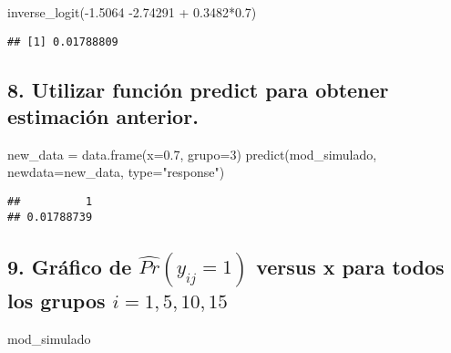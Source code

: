 \documentclass[
]{article}
\newenvironment{Shaded}{\begin{snugshade}}{\end{snugshade}}
\newcommand{\AttributeTok}[1]{\textcolor[rgb]{0.77,0.63,0.00}{#1}}
\newcommand{\DecValTok}[1]{\textcolor[rgb]{0.00,0.00,0.81}{#1}}
\newcommand{\FloatTok}[1]{\textcolor[rgb]{0.00,0.00,0.81}{#1}}
\newcommand{\FunctionTok}[1]{\textcolor[rgb]{0.00,0.00,0.00}{#1}}
\newcommand{\NormalTok}[1]{#1}
\newcommand{\OtherTok}[1]{\textcolor[rgb]{0.56,0.35,0.01}{#1}}
\newcommand{\SpecialCharTok}[1]{\textcolor[rgb]{0.00,0.00,0.00}{#1}}
\newcommand{\StringTok}[1]{\textcolor[rgb]{0.31,0.60,0.02}{#1}}
\begin{document}
\begin{Shaded}
\begin{Highlighting}[]
\FunctionTok{inverse\_logit}\NormalTok{(}\SpecialCharTok{{-}}\FloatTok{1.5064} \SpecialCharTok{{-}}\FloatTok{2.74291}   \SpecialCharTok{+} \FloatTok{0.3482}\SpecialCharTok{*}\FloatTok{0.7}\NormalTok{)}
\end{Highlighting}
\end{Shaded}

\begin{verbatim}
## [1] 0.01788809
\end{verbatim}

\hypertarget{utilizar-funciuxf3n-predict-para-obtener-estimaciuxf3n-anterior.}{%
\subsection{8. Utilizar función predict para obtener estimación
anterior.}\label{utilizar-funciuxf3n-predict-para-obtener-estimaciuxf3n-anterior.}}

\begin{Shaded}
\begin{Highlighting}[]
\NormalTok{new\_data }\OtherTok{=} \FunctionTok{data.frame}\NormalTok{(}\AttributeTok{x=}\FloatTok{0.7}\NormalTok{, }\AttributeTok{grupo=}\DecValTok{3}\NormalTok{)}
\FunctionTok{predict}\NormalTok{(mod\_simulado, }\AttributeTok{newdata=}\NormalTok{new\_data, }\AttributeTok{type=}\StringTok{"response"}\NormalTok{)}
\end{Highlighting}
\end{Shaded}

\begin{verbatim}
##          1 
## 0.01788739
\end{verbatim}

\hypertarget{gruxe1fico-de-widehatpry_ij-1-versus-x-para-todos-los-grupos-i1-5-10-15}{%
\subsection{\texorpdfstring{9. Gráfico de \(\widehat{Pr}(y_{ij} = 1)\)
versus x para todos los grupos
\(i=1, 5, 10, 15\)}{9. Gráfico de \textbackslash widehat\{Pr\}(y\_\{ij\} = 1) versus x para todos los grupos i=1, 5, 10, 15}}\label{gruxe1fico-de-widehatpry_ij-1-versus-x-para-todos-los-grupos-i1-5-10-15}}

\begin{Shaded}
\begin{Highlighting}[]
\NormalTok{mod\_simulado}
\end{Highlighting}
\end{Shaded}
\end{document}
